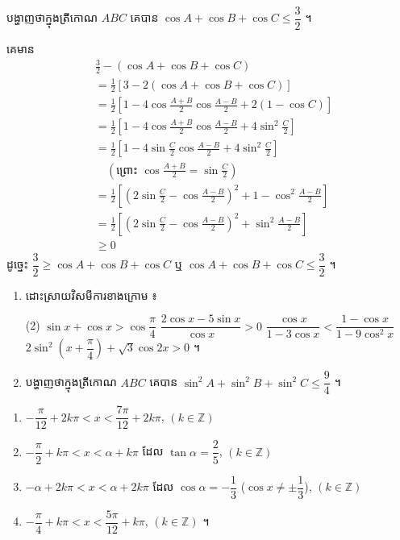 \begin{example}[លំហាត់គំរូ ៧]
បង្ហាញថាក្នុងត្រីកោណ $ABC$ គេបាន $\cos A + \cos B + \cos C \le \dfrac{3}{2}$ ។
\end{example}
\ans
គេមាន
\[
\begin{aligned}
&\frac{3}{2} - (\cos A + \cos B + \cos C)\\
&= \frac{1}{2}[3 - 2(\cos A + \cos B + \cos C)]\\
&= \frac{1}{2}\left[1 - 4\cos\frac{A + B}{2}\cos\frac{A - B}{2} + 2(1 - \cos C)\right]\\
&= \frac{1}{2}\left[1 - 4\cos\frac{A + B}{2}\cos\frac{A - B}{2} + 4\sin^2\frac{C}{2}\right]\\
&= \frac{1}{2}\left[1 - 4\sin\frac{C}{2}\cos\frac{A - B}{2} + 4\sin^2\frac{C}{2}\right]\\
&\quad \left(\text{ព្រោះ } \cos\frac{A + B}{2} = \sin\frac{C}{2}\right)\\
&= \frac{1}{2}\left[\left(2\sin\frac{C}{2} - \cos\frac{A - B}{2}\right)^2 + 1 - \cos^2\frac{A - B}{2}\right]\\
&= \frac{1}{2}\left[\left(2\sin\frac{C}{2} - \cos\frac{A - B}{2}\right)^2 + \sin^2\frac{A - B}{2}\right]\\
&\ge 0
\end{aligned}
\]
ដូច្នេះ $\dfrac{3}{2} \ge \cos A + \cos B + \cos C$ ឬ $\cos A + \cos B + \cos C \le \dfrac{3}{2}$ ។

\begin{pro}
\begin{enumerate}[1]
  \item ដោះស្រាយវិសមីការខាងក្រោម ៖
  \begin{tasks}(2)
    \task $\sin x + \cos x > \cos\dfrac{\pi}{4}$
    \task $\dfrac{2\cos x - 5\sin x}{\cos x} > 0$
    \task $\dfrac{\cos x}{1 - 3\cos x} < \dfrac{1 - \cos x}{1 - 9\cos^2 x}$
    \task $2\sin^2\left(x + \dfrac{\pi}{4}\right) + \sqrt{3}\cos 2x > 0$ ។
  \end{tasks}
  \item បង្ហាញថាក្នុងត្រីកោណ $ABC$ គេបាន $\sin^2 A + \sin^2 B + \sin^2 C \le \dfrac{9}{4}$ ។
\end{enumerate}
\ans
\begin{enumerate}[a]
  \item $-\dfrac{\pi}{12} + 2k\pi < x < \dfrac{7\pi}{12} + 2k\pi$, $(k \in \mathbb{Z})$
  \item $-\dfrac{\pi}{2} + k\pi < x < \alpha + k\pi$ ដែល $\tan\alpha = \dfrac{2}{5}$, $(k \in \mathbb{Z})$
  \item $-\alpha + 2k\pi < x < \alpha + 2k\pi$ ដែល $\cos\alpha = -\dfrac{1}{3}$ ($\cos x \ne \pm\dfrac{1}{3}$), $(k \in \mathbb{Z})$
  \item $-\dfrac{\pi}{4} + k\pi < x < \dfrac{5\pi}{12} + k\pi$, $(k \in \mathbb{Z})$ ។
\end{enumerate}
\end{pro}

